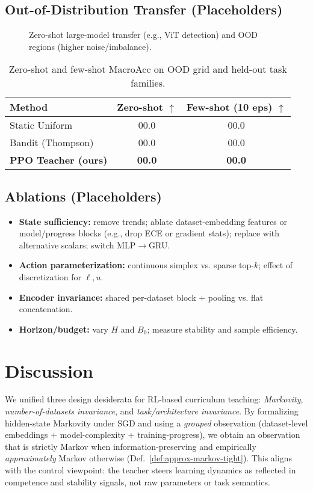\documentclass[11pt]{article}
\newcommand{\1}{\mathbf{1}}
\begin{document}
\subsection{Out-of-Distribution Transfer (Placeholders)}
\begin{figure}[H]
  \centering
  \fbox{\rule{0pt}{2in}\rule{0.95\linewidth}{0pt}}
  \caption{Zero-shot large-model transfer (e.g., ViT detection) and OOD regions (higher noise/imbalance).}
  \label{fig:ood}
\end{figure}

\begin{table}[H]
\centering
\caption{Zero-shot and few-shot MacroAcc on OOD grid and held-out task families.}
\label{tab:ood}
\begin{tabular}{lcc}
\toprule
Method & Zero-shot $\uparrow$ & Few-shot (10 eps) $\uparrow$ \\
\midrule
Static Uniform & 00.0 & 00.0 \\
Bandit (Thompson) & 00.0 & 00.0 \\
\textbf{PPO Teacher (ours)} & \textbf{00.0} & \textbf{00.0} \\
\bottomrule
\end{tabular}
\end{table}

\subsection{Ablations (Placeholders)}
\begin{itemize}[leftmargin=1.5em]
\item \textbf{State sufficiency:} remove trends; ablate dataset-embedding features or model/progress blocks (e.g., drop ECE or gradient stats); replace with alternative scalars; switch MLP$\to$GRU.
\item \textbf{Action parameterization:} continuous simplex vs. sparse top-$k$; effect of discretization for $\ell,u$.
\item \textbf{Encoder invariance:} shared per-dataset block + pooling vs. flat concatenation.
\item \textbf{Horizon/budget:} vary $H$ and $B_0$; measure stability and sample efficiency.
\end{itemize}

\section{Discussion}
We unified three design desiderata for RL-based curriculum teaching: \emph{Markovity}, \emph{number-of-datasets invariance}, and \emph{task/architecture invariance}.
By formalizing hidden-state Markovity under SGD and using a \emph{grouped} observation (dataset-level embeddings + model-complexity + training-progress), we obtain an observation that is strictly Markov when information-preserving and empirically \emph{approximately} Markov otherwise (Def.~\ref{def:approx-markov-tight}).
This aligns with the control viewpoint: the teacher steers learning dynamics as reflected in competence and stability signals, not raw parameters or task semantics.
\end{document}
